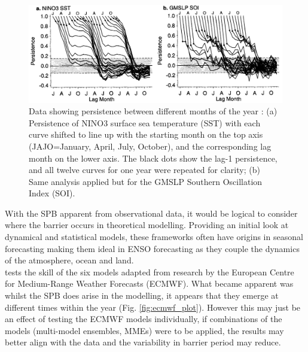 \documentclass[12pt, onecolumn]{revtex4}    %
\begin{document}
\begin{figure}
\includegraphics[width=\textwidth]{data/persistence_sst_soi}
\caption[Persistence]{Data showing persistence between different months of the year \citep{torrence1998annual}: (a) Persistence of NINO3 surface sea temperature (SST) with each curve shifted to line up with the starting month on the top axis (JAJO=January, April, July, October), and the corresponding lag month on the lower axis. The black dots show the lag-1 persistence, and all twelve curves for one year were repeated for clarity; (b) Same analysis applied but for the GMSLP Southern Oscillation Index (SOI). }
\label{fig:persistence_sst_soi}
\end{figure}

With the SPB apparent from observational data, it would be logical to consider where the barrier occurs in theoretical modelling. Providing an initial look at dynamical and statistical models, these frameworks often have origins in seasonal forecasting making them ideal in ENSO forecasting as they couple the dynamics of the atmosphere, ocean and land. \\

\cite{jan2005did} tests the skill of the six models adapted from research by the European Centre for Medium-Range Weather Forecasts (ECMWF). What became apparent was whilst the SPB does arise in the modelling, it appears that they emerge at different times within the year (Fig. \ref{fig:ecmwf_plot}). However this may just be an effect of testing the ECMWF models individually, if combinations of the models (multi-model ensembles, MMEs) were to be applied, the results may better align with the data and the variability in barrier period may reduce. \\
\end{document}
